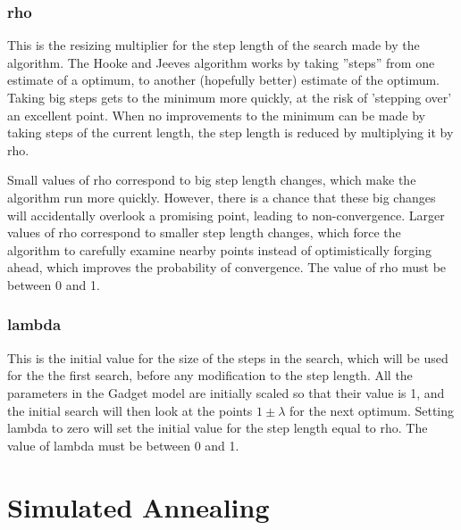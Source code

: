 \documentclass [a4paper, 10pt]{book}
\begin{document}
\subsubsection{rho}
This is the resizing multiplier for the step length of the search made by the algorithm.  The Hooke and Jeeves algorithm works by taking ''steps'' from one estimate of a optimum, to another (hopefully better) estimate of the optimum.  Taking big steps gets to the minimum more quickly, at the risk of 'stepping over' an excellent point.  When no improvements to the minimum can be made by taking steps of the current length, the step length is reduced by multiplying it by rho.

\bigskip
Small values of rho correspond to big step length changes, which make the algorithm run more quickly.  However, there is a chance that these big changes will accidentally overlook a promising point, leading to non-convergence.  Larger values of rho correspond to smaller step length changes, which force the algorithm to carefully examine nearby points instead of optimistically forging ahead, which improves the probability of convergence.  The value of rho must be between 0 and 1.

\subsubsection{lambda}
This is the initial value for the size of the steps in the search, which will be used for the the first search, before any modification to the step length.  All the parameters in the Gadget model are initially scaled so that their value is 1, and the initial search will then look at the points $1 \pm \lambda$ for the next optimum.  Setting lambda to zero will set the initial value for the step length equal to rho.  The value of lambda must be between 0 and 1.


\section{Simulated Annealing}\label{sec:simann}
\end{document}
